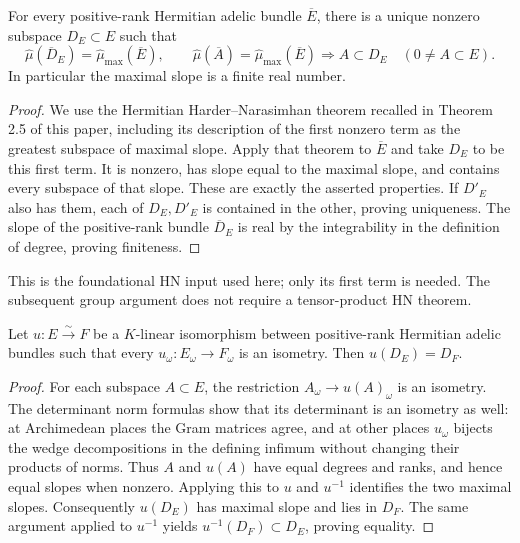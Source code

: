\begin{theorem}
\label{thm:largest-destabilizing-subspace}
\leanok
For every positive-rank Hermitian adelic bundle $\overline E$, there is a
unique nonzero subspace $D_E\subset E$ such that
\[
 \widehat\mu(\overline D_E)=\widehat\mu_{\max}(\overline E),\qquad
 \widehat\mu(\overline A)=\widehat\mu_{\max}(\overline E)
       \Longrightarrow A\subset D_E\quad(0\ne A\subset E).
\]
In particular the maximal slope is a finite real number.
\end{theorem}
\begin{proof}
We use the Hermitian Harder--Narasimhan theorem recalled in Theorem 2.5
of this paper, including its description of the first nonzero term as
the greatest subspace of maximal slope. Apply that theorem to
$\overline E$ and take $D_E$ to be this first term. It is nonzero,
has slope equal to the maximal slope, and contains every subspace of
that slope. These are exactly the asserted properties. If $D'_E$ also
has them, each of $D_E,D'_E$ is contained in the other, proving uniqueness.
The slope of the positive-rank bundle $\overline D_E$ is real by the
integrability in the definition of degree, proving finiteness.
\end{proof}

This is the foundational HN input used here; only its first term is needed.
The subsequent group argument does not require a tensor-product HN theorem.

\begin{lemma}
\label{lem:isometry-preserves-destabilizer}
\leanok
Let $u:E\xrightarrow{\sim}F$ be a $K$-linear isomorphism between
positive-rank Hermitian adelic bundles such that every
$u_\omega:E_\omega\to F_\omega$ is an isometry. Then $u(D_E)=D_F$.
\end{lemma}
\begin{proof}
For each subspace $A\subset E$, the restriction
$A_\omega\to u(A)_\omega$ is an isometry. The determinant norm formulas
show that its determinant is an isometry as well: at Archimedean places
the Gram matrices agree, and at other places $u_\omega$ bijects the
wedge decompositions in the defining infimum without changing their
products of norms. Thus $A$ and $u(A)$ have equal degrees and ranks,
and hence equal slopes when nonzero. Applying this to $u$ and $u^{-1}$
identifies the two maximal slopes. Consequently $u(D_E)$ has maximal
slope and lies in $D_F$. The same argument applied to $u^{-1}$ yields
$u^{-1}(D_F)\subset D_E$, proving equality.
\end{proof}

